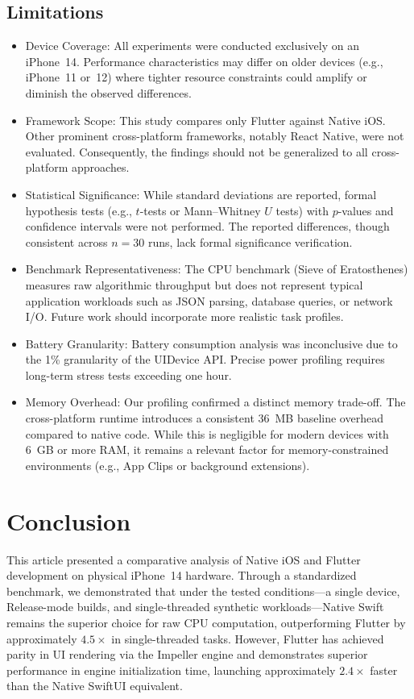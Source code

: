 \documentclass[journal]{IEEEtran}
\begin{document}
\subsection{Limitations}
\begin{itemize}
	\item Device Coverage: All experiments were conducted exclusively on an iPhone~14. Performance characteristics may differ on older devices (e.g., iPhone~11 or~12) where tighter resource constraints could amplify or diminish the observed differences.
	\item Framework Scope: This study compares only Flutter against Native iOS. Other prominent cross-platform frameworks, notably React Native, were not evaluated. Consequently, the findings should not be generalized to all cross-platform approaches.
	\item Statistical Significance: While standard deviations are reported, formal hypothesis tests (e.g., $t$-tests or Mann--Whitney $U$ tests) with $p$-values and confidence intervals were not performed. The reported differences, though consistent across $n = 30$ runs, lack formal significance verification.
	\item Benchmark Representativeness: The CPU benchmark (Sieve of Eratosthenes) measures raw algorithmic throughput but does not represent typical application workloads such as JSON parsing, database queries, or network I/O. Future work should incorporate more realistic task profiles.
	\item Battery Granularity: Battery consumption analysis was inconclusive due to the 1\% granularity of the
	      UIDevice API. Precise power profiling requires long-term stress tests exceeding one hour.
	\item Memory Overhead: Our profiling confirmed a distinct memory trade-off. The cross-platform runtime
	      introduces a consistent 36~MB baseline overhead compared to native code. While this is negligible for
	      modern devices with 6~GB or more RAM, it remains a relevant factor for memory-constrained environments
	      (e.g., App Clips or background extensions).
\end{itemize}

\section{Conclusion}
This article presented a comparative analysis of Native iOS and Flutter development on physical iPhone~14
hardware. Through a standardized benchmark, we demonstrated that under the tested conditions---a single device, Release-mode builds, and single-threaded synthetic workloads---Native Swift remains the superior choice
for raw CPU computation, outperforming Flutter by approximately $4.5\times$ in single-threaded tasks. However,
Flutter has achieved parity in UI rendering via the Impeller engine and demonstrates superior performance
in engine initialization time, launching approximately $2.4\times$ faster than the Native SwiftUI equivalent.
\end{document}
